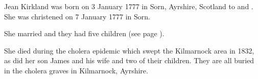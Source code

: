 
Jean Kirkland was born on 3 January 1777 in Sorn, Ayrshire, Scotland \cite{JKirklandBirth} to  and .
She was christened on 7 January 1777 in Sorn.

She married  and they had five children (see page \pageref{Robert_Dunsmore}).

She died during the cholera epidemic which swept the Kilmarnock area in 1832, as did her son James and his wife and two of their children.\cite{DRDunsmoreDeath} They are all buried in the cholera graves in Kilmarnock, Ayrshire.
